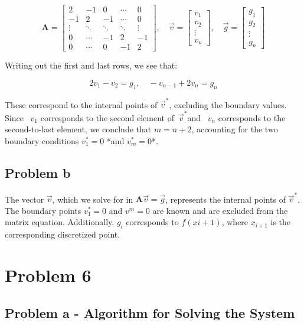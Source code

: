 \documentclass[english,notitlepage]{revtex4-1}  %
\begin{document}
$$
    \mathbf{A} = \begin{bmatrix}
        2      & -1     & 0      & \cdots & 0      \\
        -1     & 2      & -1     & \cdots & 0      \\
        \vdots & \ddots & \ddots & \ddots & \vdots \\
        0      & \cdots & -1     & 2      & -1     \\
        0      & \cdots & 0      & -1     & 2
    \end{bmatrix}, \quad \vec{v} = \begin{bmatrix}
        v_1    \\
        v_2    \\
        \vdots \\
        v_n
    \end{bmatrix}, \quad \vec{g} = \begin{bmatrix}
        g_1    \\
        g_2    \\
        \vdots \\
        g_n
    \end{bmatrix}
$$

Writing out the first and last rows, we see that:

$$
    2 v_1 - v_2 = g_1, \quad -v_{n-1} + 2 v_n = g_n
$$

These correspond to the internal points of $\vec{v}^*$, excluding the boundary values. Since  $v_1$ corresponds to the second element of $\vec{v}^*$and  $v_n$ corresponds to the second-to-last element, we conclude that $m = n + 2$, accounting for the two boundary conditions $v^*_1 = 0$ *and $v^*_m = 0$*.

\subsection*{Problem b}
The vector $\vec{v}$, which we solve for in $\mathbf{A} \vec{v} = \vec{g}$, represents the internal points of \( \vec{v}^* \). The boundary points $v^*_1 = 0$ and $ v^m = 0 $ are known and are excluded from the matrix equation. Additionally, $g_i$ corresponds to $f(x{i+1})$, where $x_{i+1}$ is the corresponding discretized point.

\section*{Problem 6}

\subsection*{Problem a - Algorithm for Solving the System}{\label{sec:algorithm}}
\end{document}
